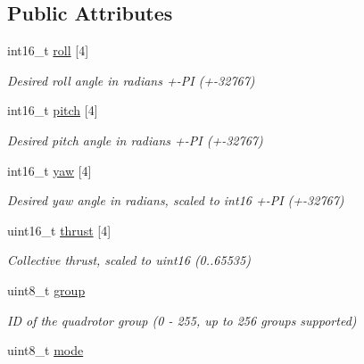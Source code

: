 \subsection*{Public Attributes}
\begin{DoxyCompactItemize}
\item 
int16\+\_\+t \hyperlink{struct____mavlink__set__quad__swarm__roll__pitch__yaw__thrust__t_a4864c1c828d0beda42938e0fc539b59b}{roll} \mbox{[}4\mbox{]}
\begin{DoxyCompactList}\small\item\em Desired roll angle in radians +-\/\+P\+I (+-\/32767) \end{DoxyCompactList}\item 
int16\+\_\+t \hyperlink{struct____mavlink__set__quad__swarm__roll__pitch__yaw__thrust__t_acbe8d4bd179df9820c7e5f3de018708c}{pitch} \mbox{[}4\mbox{]}
\begin{DoxyCompactList}\small\item\em Desired pitch angle in radians +-\/\+P\+I (+-\/32767) \end{DoxyCompactList}\item 
int16\+\_\+t \hyperlink{struct____mavlink__set__quad__swarm__roll__pitch__yaw__thrust__t_af2117d5ce6d9f7651924cb3091279121}{yaw} \mbox{[}4\mbox{]}
\begin{DoxyCompactList}\small\item\em Desired yaw angle in radians, scaled to int16 +-\/\+P\+I (+-\/32767) \end{DoxyCompactList}\item 
uint16\+\_\+t \hyperlink{struct____mavlink__set__quad__swarm__roll__pitch__yaw__thrust__t_a085e7ec86e906997e9e2953eab4713e8}{thrust} \mbox{[}4\mbox{]}
\begin{DoxyCompactList}\small\item\em Collective thrust, scaled to uint16 (0..65535) \end{DoxyCompactList}\item 
\hypertarget{struct____mavlink__set__quad__swarm__roll__pitch__yaw__thrust__t_ac837a11de67fbc795765422af3441bfc}{uint8\+\_\+t \hyperlink{struct____mavlink__set__quad__swarm__roll__pitch__yaw__thrust__t_ac837a11de67fbc795765422af3441bfc}{group}}\label{struct____mavlink__set__quad__swarm__roll__pitch__yaw__thrust__t_ac837a11de67fbc795765422af3441bfc}

\begin{DoxyCompactList}\small\item\em I\+D of the quadrotor group (0 -\/ 255, up to 256 groups supported) \end{DoxyCompactList}\item 
\hypertarget{struct____mavlink__set__quad__swarm__roll__pitch__yaw__thrust__t_ad5c5e1e904f27689534fb1075c2b8591}{uint8\+\_\+t \hyperlink{struct____mavlink__set__quad__swarm__roll__pitch__yaw__thrust__t_ad5c5e1e904f27689534fb1075c2b8591}{mode}}\label{struct____mavlink__set__quad__swarm__roll__pitch__yaw__thrust__t_ad5c5e1e904f27689534fb1075c2b8591}


\end{DoxyCompactItemize}
